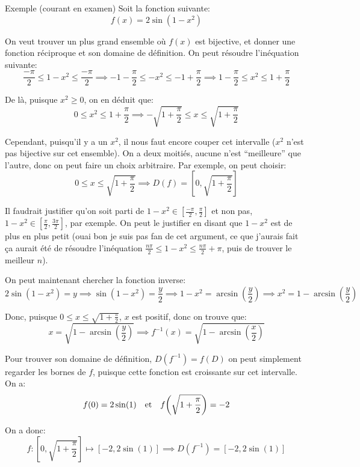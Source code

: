 \documentclass[a4paper]{article}
\begin{document}
\begin{parag}{Exemple (courant en examen)}
    Soit la fonction suivante: 
    \[f\left(x\right) = 2\sin\left(1 - x^2\right)\]
    
    On veut trouver un plus grand ensemble où $f\left(x\right)$ est bijective, et donner une fonction réciproque et son domaine de définition. On peut résoudre l'inéquation suivante:
    \[\frac{-\pi}{2} \leq 1 - x^2 \leq \frac{-\pi}{2} \implies -1 - \frac{\pi}{2} \leq -x^2 \leq -1 + \frac{\pi}{2} \implies 1 - \frac{\pi}{2} \leq x^2 \leq 1 + \frac{\pi}{2}\]

    De là, puisque $x^2 \geq 0$, on en déduit que:
    \[0 \leq x^2 \leq 1 + \frac{\pi}{2} \implies -\sqrt{1 + \frac{\pi}{2}} \leq x \leq \sqrt{1 + \frac{\pi}{2}}\]

    Cependant, puisqu'il y a un $x^2$, il nous faut encore couper cet intervalle ($x^2$ n'est pas bijective sur cet ensemble). On a deux moitiés, aucune n'est ``meilleure'' que l'autre, donc on peut faire un choix arbitraire. Par exemple, on peut choisir: 
    \[0 \leq x \leq \sqrt{1 + \frac{\pi}{2}} \implies D\left(f\right) = \left[0, \sqrt{1 + \frac{\pi}{2}}\right]\]
    
    Il faudrait justifier qu'on soit parti de $1 - x^2 \in \left[\frac{-\pi}{2}, \frac{\pi}{2}\right]$ et non pas, $1 - x^2 \in \left[\frac{\pi}{2}, \frac{3\pi}{2}\right]$, par exemple. On peut le justifier en disant que $1 - x^2$ est de plus en plus petit (ouai bon je suis pas fan de cet argument, ce que j'aurais fait ça aurait été de résoudre l'inéquation $\frac{n\pi}{2} \leq 1 - x^2 \leq \frac{n\pi}{2} + \pi$, puis de trouver le meilleur $n$).
    
    On peut maintenant chercher la fonction inverse: 
    \[2\sin\left(1 - x^2\right) = y \implies \sin\left(1 - x^2\right) = \frac{y}{2} \implies 1 - x^2 = \arcsin\left(\frac{y}{2}\right) \implies x^2 = 1 - \arcsin\left(\frac{y}{2}\right)\]

    Donc, puisque $0 \leq x \leq \sqrt{1 + \frac{\pi}{2}}$, $x$ est positif, donc on trouve que: 
    \[x = \sqrt{1 - \arcsin\left(\frac{y}{2}\right)} \implies f^{-1}\left(x\right) = \sqrt{1 - \arcsin\left(\frac{x}{2}\right)}\]
    
    Pour trouver son domaine de définition, $D\left(f^{-1}\right) = f\left(D\right)$ on peut simplement regarder les bornes de $f$, puisque cette fonction est croissante sur cet intervalle. On a: 
    \[f\left(0\right) = 2\sin\left(1\right) \mathspace \text{et} \mathspace f\left(\sqrt{1 + \frac{\pi}{2}}\right) = -2\]
    
    On a donc: 
    \[f: \left[0, \sqrt{1 + \frac{\pi}{2}}\right] \mapsto \left[-2, 2\sin\left(1\right)\right] \implies D\left(f^{-1}\right) = \left[-2, 2\sin\left(1\right)\right] \]
    
    
\end{parag}
\end{document}
